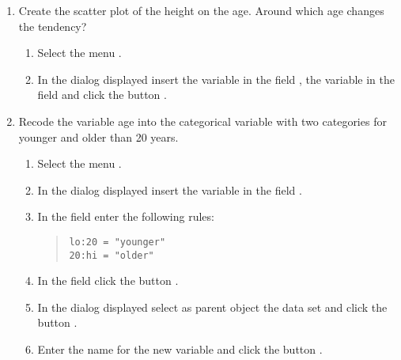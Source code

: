 \begin{enumerate}[leftmargin=*]
\begin{enumerate}
\item Create the scatter plot of the height on the age. 
Around which age changes the tendency?
\begin{indication}
\begin{enumerate}
\item Select the menu .
\item In the dialog displayed insert the variable  in the field ,
the variable  in the field  and click the button .
\end{enumerate}
\end{indication}

\item Recode the variable age into the categorical variable  with two categories for younger
and older than 20 years.
\begin{indication}
\begin{enumerate}
\item Select the menu .
\item In the dialog displayed insert the variable  in the field .
\item In the field  enter the following rules:
\begin{quote}
\lstinline{lo:20 = "younger"}\\
\lstinline{20:hi = "older"}
\end{quote}
\item In the field  click the button .
\item In the dialog displayed select as parent object the data set  and click the button
.
\item Enter the name  for the new variable and click the button .
\end{enumerate}
\end{indication}


\end{enumerate}
\end{enumerate}
